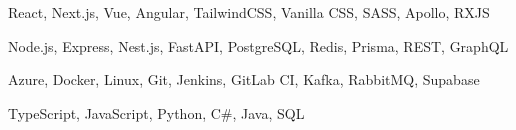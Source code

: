 
{\bodytext React, Next.js, Vue, Angular, TailwindCSS, Vanilla CSS, SASS, Apollo, RXJS\par}

\vspace{\sidebarsubsectionsep}
{\bodytext Node.js, Express, Nest.js, FastAPI, PostgreSQL, Redis, Prisma, REST, GraphQL\par}

\vspace{\sidebarsubsectionsep}
{\bodytext Azure, Docker, Linux, Git, Jenkins, GitLab CI, Kafka, RabbitMQ, Supabase\par}

\vspace{\sidebarsubsectionsep}
{\bodytext TypeScript, JavaScript, Python, C\#, Java, SQL\par}

